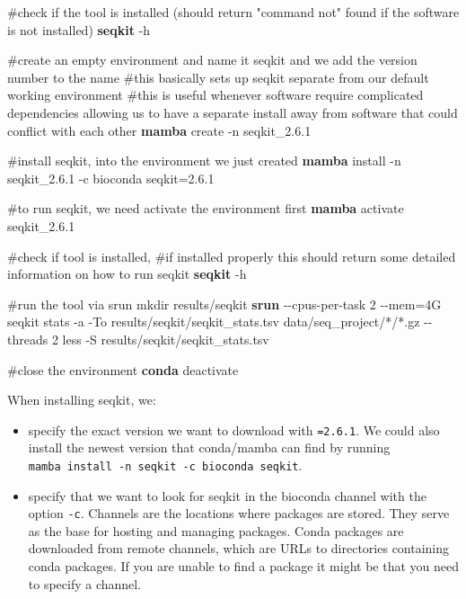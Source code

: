 \documentclass[
  letterpaper,
  DIV=11,
  numbers=noendperiod]{scrreprt}
\newenvironment{Shaded}{}{}
\newcommand{\AttributeTok}[1]{\textcolor[rgb]{0.84,0.23,0.29}{#1}}
\newcommand{\CommentTok}[1]{\textcolor[rgb]{0.42,0.45,0.49}{#1}}
\newcommand{\ExtensionTok}[1]{\textcolor[rgb]{0.84,0.23,0.29}{\textbf{#1}}}
\newcommand{\FunctionTok}[1]{\textcolor[rgb]{0.44,0.26,0.76}{#1}}
\newcommand{\NormalTok}[1]{\textcolor[rgb]{0.14,0.16,0.18}{#1}}
\newcommand{\OperatorTok}[1]{\textcolor[rgb]{0.14,0.16,0.18}{#1}}
\newcommand{\PreprocessorTok}[1]{\textcolor[rgb]{0.84,0.23,0.29}{#1}}
\begin{document}
\begin{Shaded}
\begin{Highlighting}[]
\CommentTok{\#check if the tool is installed (should return "command not" found if the software is not installed)}
\ExtensionTok{seqkit} \AttributeTok{{-}h}

\CommentTok{\#create an empty environment and name it seqkit and we add the version number to the name}
\CommentTok{\#this basically sets up seqkit separate from our default working environment}
\CommentTok{\#this is useful whenever software require complicated dependencies allowing us to have a separate install away from software that could conflict with each other}
\ExtensionTok{mamba}\NormalTok{ create }\AttributeTok{{-}n}\NormalTok{ seqkit\_2.6.1}

\CommentTok{\#install seqkit, into the environment we just created}
\ExtensionTok{mamba}\NormalTok{ install }\AttributeTok{{-}n}\NormalTok{ seqkit\_2.6.1 }\AttributeTok{{-}c}\NormalTok{ bioconda seqkit=2.6.1}

\CommentTok{\#to run seqkit, we need activate the environment first}
\ExtensionTok{mamba}\NormalTok{ activate seqkit\_2.6.1}

\CommentTok{\#check if tool is installed, }
\CommentTok{\#if installed properly this should return some detailed information on how to run seqkit}
\ExtensionTok{seqkit} \AttributeTok{{-}h}

\CommentTok{\#run the tool via srun}
\FunctionTok{mkdir}\NormalTok{ results/seqkit}
\ExtensionTok{srun} \AttributeTok{{-}{-}cpus{-}per{-}task}\NormalTok{ 2 }\AttributeTok{{-}{-}mem}\OperatorTok{=}\NormalTok{4G seqkit stats }\AttributeTok{{-}a} \AttributeTok{{-}To}\NormalTok{ results/seqkit/seqkit\_stats.tsv data/seq\_project/}\PreprocessorTok{*}\NormalTok{/}\PreprocessorTok{*}\NormalTok{.gz }\AttributeTok{{-}{-}threads}\NormalTok{ 2}
\FunctionTok{less} \AttributeTok{{-}S}\NormalTok{ results/seqkit/seqkit\_stats.tsv }

\CommentTok{\#close the environment}
\ExtensionTok{conda}\NormalTok{ deactivate}
\end{Highlighting}
\end{Shaded}

When installing seqkit, we:

\begin{itemize}
\item
  specify the exact version we want to download with \texttt{=2.6.1}. We
  could also install the newest version that conda/mamba can find by
  running \texttt{mamba\ install\ -n\ seqkit\ -c\ bioconda\ seqkit}.
\item
  specify that we want to look for seqkit in the bioconda channel with
  the option \texttt{-c}. Channels are the locations where packages are
  stored. They serve as the base for hosting and managing packages.
  Conda packages are downloaded from remote channels, which are URLs to
  directories containing conda packages. If you are unable to find a
  package it might be that you need to specify a channel.
\end{itemize}
\end{document}
